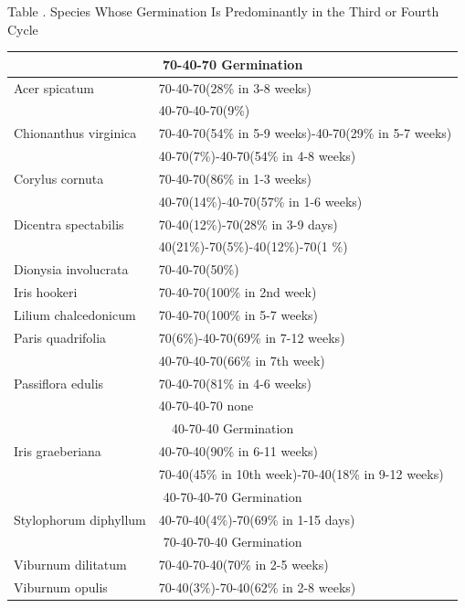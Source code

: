 \begin{table}[h]
\begin{center}
Table \thetable. Species Whose Germination Is Predominantly in the Third or Fourth Cycle
\end{center}

\par
\begin{tabular}{|l|l|}
\hline

\multicolumn{2}{|c|}{70-40-70 Germination } \\
\hline
Acer spicatum & 70-40-70(28\% in 3-8 weeks) \\
 & 40-70-40-70(9\%) \\
Chionanthus virginica & 70-40-70(54\% in 5-9 weeks)-40-70(29\% in 5-7 weeks) \\
 & 40-70(7\%)-40-70(54\% in 4-8 weeks) \\
Corylus cornuta & 70-40-70(86\% in 1-3 weeks) \\
 & 40-70(14\%)-40-70(57\% in 1-6 weeks) \\
Dicentra spectabilis & 70-40(12\%)-70(28\% in 3-9 days) \\
 & 40(21\%)-70(5\%)-40(12\%)-70(1 \%) \\
Dionysia involucrata & 70-40-70(50\%) \\
Iris hookeri & 70-40-70(100\% in 2nd week) \\
Lilium chalcedonicum & 70-40-70(100\% in 5-7 weeks) \\
Paris quadrifolia & 70(6\%)-40-70(69\% in 7-12 weeks) \\
 & 40-70-40-70(66\% in 7th week) \\
Passiflora edulis & 70-40-70(81\% in 4-6 weeks) \\
 & 40-70-40-70 none \\
\hline
\multicolumn{2}{|c|}{ 40-70-40 Germination } \\
\hline
Iris graeberiana      & 40-70-40(90\% in 6-11 weeks) \\
 & 70-40(45\% in 10th week)-70-40(18\% in 9-12 weeks) \\
\hline
\multicolumn{2}{|c|}{ 40-70-40-70 Germination } \\
\hline
Stylophorum diphyllum & 40-70-40(4\%)-70(69\% in 1-15 days) \\
\hline
\multicolumn{2}{|c|}{ 70-40-70-40 Germination } \\
\hline
Viburnum dilitatum    & 70-40-70-40(70\% in 2-5 weeks) \\
Viburnum opulis       & 70-40(3\%)-70-40(62\% in 2-8 weeks) \\
\hline

\end{tabular}
\label{table:s34}
\end{table}

